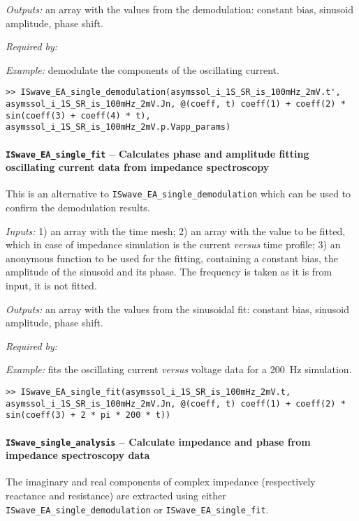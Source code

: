 		\textit{Outputs:} an array with the values from the demodulation: constant
		     bias, sinusoid amplitude, phase shift.
		
		
		\textit{Required by:} 
		
		
		\textit{Example:} demodulate the components of the oscillating current.
		\begin{lstlisting}[style=Matlab-editor]
>> ISwave_EA_single_demodulation(asymssol_i_1S_SR_is_100mHz_2mV.t', asymssol_i_1S_SR_is_100mHz_2mV.Jn, @(coeff, t) coeff(1) + coeff(2) * sin(coeff(3) + coeff(4) * t), asymssol_i_1S_SR_is_100mHz_2mV.p.Vapp_params)
		\end{lstlisting}
		
		
\paragraph{\texttt{ISwave\_EA\_single\_fit} -- Calculates phase and amplitude fitting oscillating current data from impedance spectroscopy}
This is an alternative to \texttt{ISwave\_EA\_single\_demodulation} which can be used to confirm the demodulation results.

\textit{Inputs:} 1) an array with the time mesh;
   2) an array with the value to be fitted, which in case of impedance simulation is the current \textsl{versus} time profile;
   3) an anonymous function to be used for the fitting, containing
     a constant bias, the amplitude of the sinusoid and its phase. The
     frequency is taken as it is from input, it is not fitted.

\textit{Outputs:} an array with the values from the sinusoidal fit: constant
     bias, sinusoid amplitude, phase shift.


\textit{Required by:} 

		\textit{Example:} fits the oscillating current \textsl{versus} voltage data for a \SI{200}{\Hz} simulation.
\begin{lstlisting}[style=Matlab-editor]
>> ISwave_EA_single_fit(asymssol_i_1S_SR_is_100mHz_2mV.t, asymssol_i_1S_SR_is_100mHz_2mV.Jn, @(coeff, t) coeff(1) + coeff(2) * sin(coeff(3) + 2 * pi * 200 * t))
\end{lstlisting}



\paragraph{\texttt{ISwave\_single\_analysis} -- Calculate impedance and phase from impedance spectroscopy data}
The imaginary and real components of complex impedance (respectively reactance and resistance) are extracted using either \texttt{ISwave\_EA\_single\_demodulation} or \texttt{ISwave\_EA\_single\_fit}.

